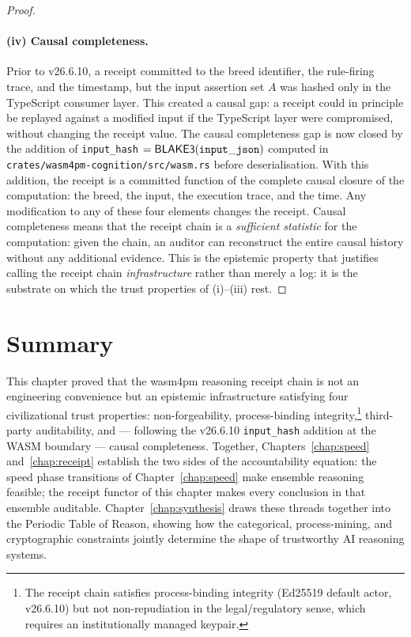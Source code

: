 \begin{proof}
\paragraph{(iv) Causal completeness.}
Prior to v26.6.10, a receipt committed to the breed identifier, the rule-firing trace,
and the timestamp, but the input assertion set $A$ was hashed only in the TypeScript
consumer layer.  This created a causal gap: a receipt could in principle be replayed
against a modified input if the TypeScript layer were compromised, without changing the
receipt value.  The causal completeness gap is now closed \cite{chatman2025proofbound} by the addition of
\texttt{input\_hash} $= \mathsf{BLAKE3}(\mathtt{input\_json})$ computed in
\texttt{crates/wasm4pm-cognition/src/wasm.rs} before deserialisation.  With this
addition, the receipt is a committed function of the complete causal closure of the
computation: the breed, the input, the execution trace, and the time.  Any modification
to any of these four elements changes the receipt.  Causal completeness means that the
receipt chain is a \emph{sufficient statistic} for the computation: given the chain,
an auditor can reconstruct the entire causal history without any additional evidence.
This is the epistemic property that justifies calling the receipt chain
\emph{infrastructure} rather than merely a log: it is the substrate on which
the trust properties of (i)--(iii) rest.
\end{proof}

\section{Summary}
\label{sec:receipt-summary}

This chapter proved that the wasm4pm reasoning receipt chain is not an engineering
convenience but an epistemic infrastructure satisfying four civilizational trust properties:
non-forgeability, process-binding integrity,\footnote{The receipt chain satisfies
process-binding integrity (Ed25519 default actor, v26.6.10) but not non-repudiation in
the legal/regulatory sense, which requires an institutionally managed keypair.}
third-party auditability, and --- following the v26.6.10 \texttt{input\_hash} addition
at the WASM boundary --- causal completeness.  Together,
Chapters~\ref{chap:speed} and~\ref{chap:receipt} establish the two sides of the
accountability equation: the speed phase transitions of Chapter~\ref{chap:speed} make
ensemble reasoning feasible; the receipt functor of this chapter makes every conclusion in
that ensemble auditable.  Chapter~\ref{chap:synthesis} draws these threads together into
the Periodic Table of Reason, showing how the categorical, process-mining, and
cryptographic constraints jointly determine the shape of trustworthy AI reasoning systems.
